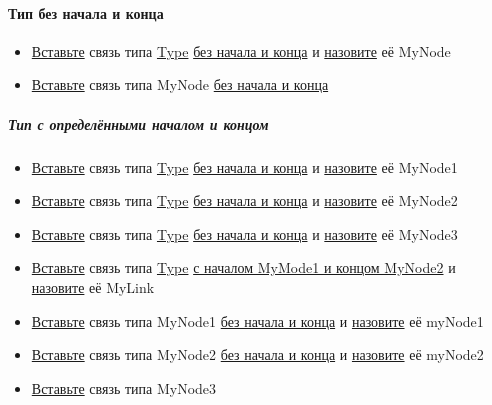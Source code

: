 \documentclass{article}
\begin{document}
\paragraph{Тип без начала и конца}
\begin{itemize}
  \item \hyperlink{DeepCase.InsertLink.Description}{Вставьте} связь типа
        \hyperlink{Core.Type.Description}{Type} \hyperlink{FAQ.HowToInsertLinkWithoutFromAndTo}{без
          начала и конца} и \hyperlink{FAQ.HowToSetName}{назовите} её MyNode
  \item \hyperlink{DeepCase.InsertLink.Description}{Вставьте} связь типа MyNode
        \hyperlink{FAQ.HowToInsertLinkWithoutFromAndTo}{без начала и конца}
\end{itemize}
\subparagraph{Тип с определёнными началом и концом}
\begin{itemize}
  \item \hyperlink{DeepCase.InsertLink.Description}{Вставьте} связь типа
        \hyperlink{Core.Type.Description}{Type} \hyperlink{FAQ.HowToInsertLinkWithoutFromAndTo}{без
          начала и конца} и \hyperlink{FAQ.HowToSetName}{назовите} её MyNode1
  \item \hyperlink{DeepCase.InsertLink.Description}{Вставьте} связь типа
        \hyperlink{Core.Type.Description}{Type} \hyperlink{FAQ.HowToInsertLinkWithoutFromAndTo}{без
          начала и конца} и \hyperlink{FAQ.HowToSetName}{назовите} её MyNode2
  \item \hyperlink{DeepCase.InsertLink.Description}{Вставьте} связь типа
        \hyperlink{Core.Type.Description}{Type} \hyperlink{FAQ.HowToInsertLinkWithoutFromAndTo}{без
          начала и конца} и \hyperlink{FAQ.HowToSetName}{назовите} её MyNode3
  \item \hyperlink{DeepCase.InsertLink.Description}{Вставьте} связь типа
        \hyperlink{Core.Type.Description}{Type} \hyperlink{FAQ.HowToInsertLinkWithFromAndTo}{с
          началом MyMode1 и концом MyNode2} и \hyperlink{FAQ.HowToSetName}{назовите} её
        MyLink
  \item \hyperlink{DeepCase.InsertLink.Description}{Вставьте} связь типа MyNode1
        \hyperlink{FAQ.HowToInsertLinkWithoutFromAndTo}{без начала и конца} и
        \hyperlink{FAQ.HowToSetName}{назовите} её myNode1
  \item \hyperlink{DeepCase.InsertLink.Description}{Вставьте} связь типа MyNode2
        \hyperlink{FAQ.HowToInsertLinkWithoutFromAndTo}{без начала и конца} и
        \hyperlink{FAQ.HowToSetName}{назовите} её myNode2
  \item \hyperlink{DeepCase.InsertLink.Description}{Вставьте} связь типа MyNode3

\end{itemize}
\end{document}
